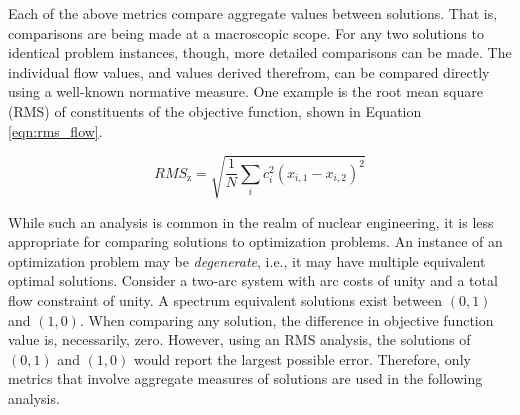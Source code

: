 Each of the above metrics compare aggregate values between solutions. That is,
comparisons are being made at a macroscopic scope. For any two solutions to
identical problem instances, though, more detailed comparisons can be made. The
individual flow values, and values derived therefrom, can be compared directly
using a well-known normative measure. One example is the root mean square (RMS)
of constituents of the objective function, shown in Equation
\ref{eqn:rms_flow}.

\begin{equation}\label{eqn:rms_flow}
RMS_{\text{z}} = \sqrt{ \frac{1}{N} \sum_i c_i^2 (x_{i, 1} - x_{i, 2}) ^2 }
\end{equation}

While such an analysis is common in the realm of nuclear engineering, it is less
appropriate for comparing solutions to optimization problems. An instance of an
optimization problem may be \textit{degenerate}, i.e., it may have multiple
equivalent optimal solutions. Consider a two-arc system with arc costs of unity
and a total flow constraint of unity. A spectrum equivalent solutions exist
between $(0, 1)$ and $(1, 0)$. When comparing any solution, the difference in
objective function value is, necessarily, zero. However, using an RMS analysis,
the solutions of $(0, 1)$ and $(1, 0)$ would report the largest possible
error. Therefore, only metrics that involve aggregate measures of solutions are
used in the following analysis.

